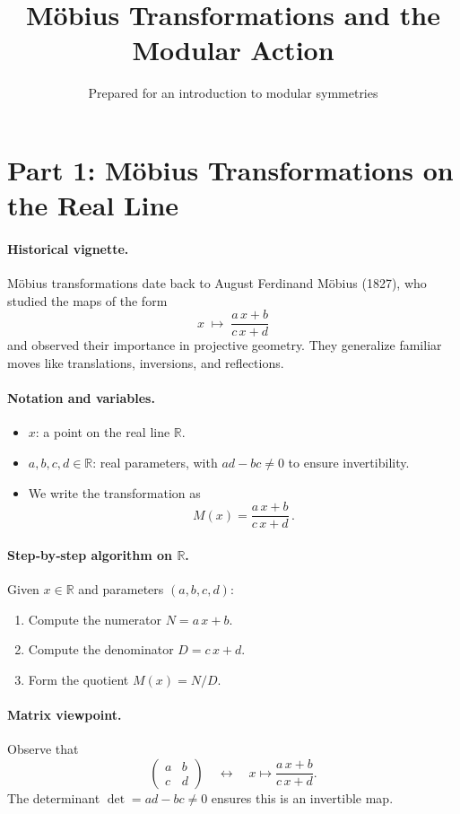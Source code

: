 \documentclass[11pt]{article}
\title{Möbius Transformations and the Modular Action}
\author{Prepared for an introduction to modular symmetries}
\date{}
\begin{document}
\maketitle

\section*{Part 1: Möbius Transformations on the Real Line}

\paragraph{Historical vignette.}
Möbius transformations date back to August Ferdinand Möbius (1827), who studied the maps of the form
\[
x \;\longmapsto\; \frac{a\,x + b}{c\,x + d}
\]
and observed their importance in projective geometry.  They generalize familiar moves like translations, inversions, and reflections.

\paragraph{Notation and variables.}
\begin{itemize}
  \item \(x\): a point on the real line \(\mathbb{R}\).
  \item \(a,b,c,d\in\mathbb{R}\): real parameters, with \(ad - bc\neq 0\) to ensure invertibility.
  \item We write the transformation as
    \[
      M(x) = \frac{a\,x + b}{c\,x + d}\,.
    \]
\end{itemize}

\paragraph{Step‐by‐step algorithm on \(\mathbb{R}\).}
Given \(x\in\mathbb{R}\) and parameters \((a,b,c,d)\):
\begin{enumerate}
  \item Compute the numerator \(N = a\,x + b\).
  \item Compute the denominator \(D = c\,x + d\).
  \item Form the quotient \(M(x) = N/D\).
\end{enumerate}

\paragraph{Matrix viewpoint.}
Observe that
\[
\begin{pmatrix}a & b\\ c & d\end{pmatrix}
\quad\longleftrightarrow\quad
x \longmapsto \frac{a\,x + b}{c\,x + d}.
\]
The determinant \(\det = ad - bc\neq0\) ensures this is an invertible map.
\end{document}
